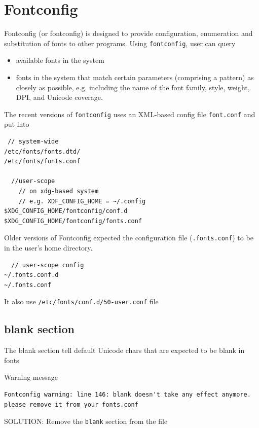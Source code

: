 \section{Fontconfig}
\label{sec:fontconfig}

Fontconfig (or fontconfig) is designed to provide configuration, enumeration and
substitution of fonts to other programs. Using \verb!fontconfig!, user can query
\begin{itemize}
  \item available fonts in the system
  \item fonts in the system that match  certain parameters (comprising a
  pattern) as closely as possible, e.g.
  including the name of the font family, style, weight, DPI, and Unicode
  coverage. 
\end{itemize}

The recent versions of \verb!fontconfig! uses an XML-based config file
\verb!font.conf! and put into
\begin{verbatim}
 // system-wide
/etc/fonts/fonts.dtd/ 
/etc/fonts/fonts.conf

  //user-scope 
    // on xdg-based system
    // e.g. XDF_CONFIG_HOME = ~/.config
$XDG_CONFIG_HOME/fontconfig/conf.d
$XDG_CONFIG_HOME/fontconfig/fonts.conf
\end{verbatim}

\begin{mdframed}
Older versions of Fontconfig expected the configuration file
(\verb!.fonts.conf!) to be in the user's home directory.
\begin{verbatim}
  // user-scope config
~/.fonts.conf.d
~/.fonts.conf 
\end{verbatim}

\end{mdframed}

It also use \verb!/etc/fonts/conf.d/50-user.conf! file

\subsection{blank section}

The blank section tell default Unicode chars that are expected to be blank in
fonts

Warning message
\begin{verbatim}
Fontconfig warning: line 146: blank doesn't take any effect anymore. please remove it from your fonts.conf
\end{verbatim}
SOLUTION: Remove the \verb!blank! section from the file

